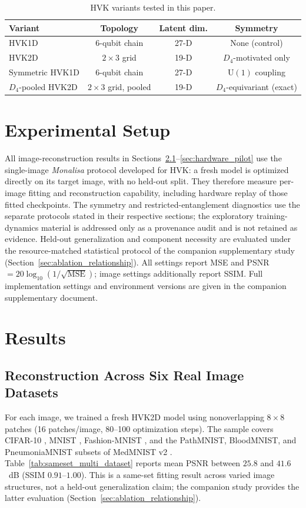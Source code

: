 \documentclass[sn-mathphys,Numbered]{sn-jnl}
\begin{document}
\begin{table}[t]
\centering
\caption{HVK variants tested in this paper.}
\label{tab:variants}
\scriptsize
\begin{tabular}{lccc}
\toprule
Variant & Topology & Latent dim. & Symmetry \\
\midrule
HVK1D & 6-qubit chain & 27-D & None (control) \\
HVK2D & $2\times3$ grid & 19-D & $D_4$-motivated only \\
Symmetric HVK1D & 6-qubit chain & 27-D & $\mathrm{U}(1)$ coupling \\
$D_4$-pooled HVK2D & $2\times3$ grid, pooled & 19-D & $D_4$-equivariant (exact) \\
\bottomrule
\end{tabular}
\end{table}

\section{Experimental Setup}
\label{sec:protocol}
All image-reconstruction results in Sections~\ref{sec:sameset_results}--\ref{sec:hardware_pilot} use the single-image \textit{Monalisa} protocol developed for HVK: a fresh model is optimized directly on its target image, with no held-out split. They therefore measure per-image fitting and reconstruction capability, including hardware replay of those fitted checkpoints. The symmetry and restricted-entanglement diagnostics use the separate protocols stated in their respective sections; the exploratory training-dynamics material is addressed only as a provenance audit and is not retained as evidence. Held-out generalization and component necessity are evaluated under the resource-matched statistical protocol of the companion supplementary study (Section~\ref{sec:ablation_relationship}). All settings report MSE and PSNR $=20\log_{10}(1/\sqrt{\mathrm{MSE}})$; image settings additionally report SSIM. Full implementation settings and environment versions are given in the companion supplementary document.

\section{Results}
\label{sec:results}

\subsection{Reconstruction Across Six Real Image Datasets}
\label{sec:sameset_results}
For each image, we trained a fresh HVK2D model using nonoverlapping $8\times8$ patches (16 patches/image, 80--100 optimization steps). The sample covers CIFAR-10 \cite{Krizhevsky2009}, MNIST \cite{LeCun1998}, Fashion-MNIST \cite{Xiao2017}, and the PathMNIST, BloodMNIST, and PneumoniaMNIST subsets of MedMNIST v2 \cite{Yang2023}. Table~\ref{tab:sameset_multi_dataset} reports mean PSNR between $25.8$ and $41.6$~dB (SSIM $0.91$--$1.00$). This is a same-set fitting result across varied image structures, not a held-out generalization claim; the companion study provides the latter evaluation (Section~\ref{sec:ablation_relationship}).
\end{document}
